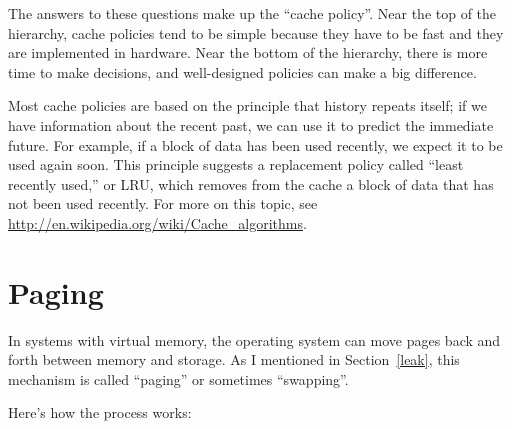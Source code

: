\documentclass[12pt]{book}
\begin{document}
The answers to these questions make up the ``cache policy''.
Near the top of the hierarchy, cache policies tend to be simple
because they have to be fast and they are implemented in hardware.
Near the bottom of the hierarchy, there is more time to make decisions,
and well-designed policies can make a big difference.

Most cache policies are based on the principle that history repeats
itself; if we have information about the recent past, we can use it to
predict the immediate future.  For example, if a block of data has
been used recently, we expect it to be used again soon.  This
principle suggests a replacement policy called ``least recently
used,'' or LRU, which removes from the cache a block of data that
has not been used recently.  For more on this topic, see
\url{http://en.wikipedia.org/wiki/Cache_algorithms}.


\section{Paging}
\label{paging}

In systems with virtual memory, the operating system can move
pages back and forth between memory and storage.  As I mentioned
in Section~\ref{leak}, this mechanism is called ``paging'' or
sometimes ``swapping''.

Here's how the process works:
\end{document}
